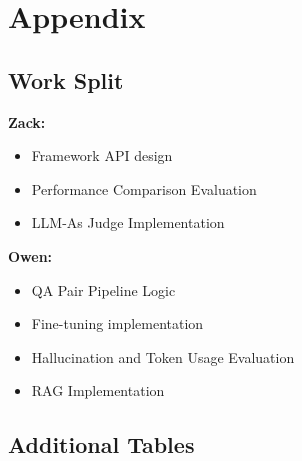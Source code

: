 \clearpage
\appendix
\section{Appendix}

\subsection{Work Split}

\textbf{Zack:}
\begin{itemize}
    \item Framework API design
    \item Performance Comparison Evaluation
    \item LLM-As Judge Implementation
\end{itemize}

\vspace{1em}

\textbf{Owen:}
\begin{itemize}
    \item QA Pair Pipeline Logic
    \item Fine-tuning implementation
    \item Hallucination and Token Usage Evaluation
    \item RAG Implementation
\end{itemize}

\subsection{Additional Tables}

